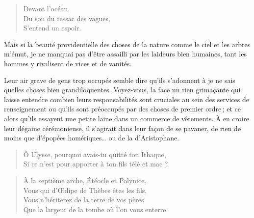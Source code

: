 \begin{verse}\haiku
  Devant l’océan,\\  %
  Du son du ressac des vagues,\\  %
  S’entend un espoir.
\end{verse}

\begin{prose}
  Mais si la beauté providentielle des choses de la nature comme le ciel et les arbres m’émut, je ne manquai pas d’être assailli par les laideurs bien humaines, tant les hommes y rivalisent de vices et de vanités. 

  Leur air grave de gens trop occupés semble dire qu’ils s’adonnent à je ne sais quelles choses bien grandiloquentes. Voyez-vous, la face un rien grimaçante qui laisse entendre combien leurs responsabilités sont cruciales au sein des services de renseignement ou qu’ils sont préoccupés par des choses de premier ordre\,; et ce alors qu’ils essayent une petite laine dans un commerce de vêtements. À en croire leur dégaine cérémonieuse, il s’agirait dans leur façon de se pavaner, de rien de moins que d’épopées homériques… ou de la  d’Aristophane. %
\end{prose}

\begin{verse}\distique
  Ô Ulysse, pourquoi avais-tu quitté ton Ithaque,\\ 
  Si ce n’est pour apporter à ton fils télé et mac%
   ?
\end{verse}

\begin{verse}\quatrain
  À la septième arche, Étéocle et Polynice,\\ 
  Vous qui d’Œdipe de Thèbes êtes les fils,\\ 
  Vous n’hériterez de la terre de vos pères\\ 
  Que la largeur de la tombe où l’on vous enterre.  %
\end{verse}


